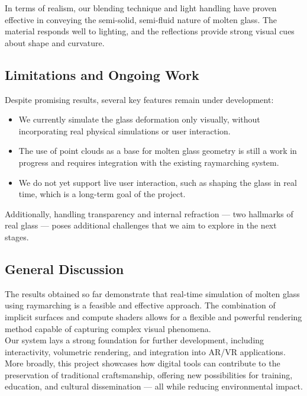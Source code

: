 \documentclass{rapportcs}
\begin{document}
In terms of realism, our blending technique and light handling have proven effective in conveying the semi-solid, semi-fluid nature of molten glass. The material responds well to lighting, and the reflections provide strong visual cues about shape and curvature.

\newpage
\subsection{Limitations and Ongoing Work}
Despite promising results, several key features remain under development:

\begin{itemize}
    \item We currently simulate the glass deformation only visually, without incorporating real physical simulations or user interaction.\\

    \item The use of point clouds as a base for molten glass geometry is still a work in progress and requires integration with the existing raymarching system.\\

    \item We do not yet support live user interaction, such as shaping the glass in real time, which is a long-term goal of the project.\\
\end{itemize}

Additionally, handling transparency and internal refraction — two hallmarks of real glass — poses additional challenges that we aim to explore in the next stages.

\subsection{General Discussion}
The results obtained so far demonstrate that real-time simulation of molten glass using raymarching is a feasible and effective approach. The combination of implicit surfaces and compute shaders allows for a flexible and powerful rendering method capable of capturing complex visual phenomena.\\

Our system lays a strong foundation for further development, including interactivity, volumetric rendering, and integration into AR/VR applications. More broadly, this project showcases how digital tools can contribute to the preservation of traditional craftsmanship, offering new possibilities for training, education, and cultural dissemination — all while reducing environmental impact.
\end{document}
